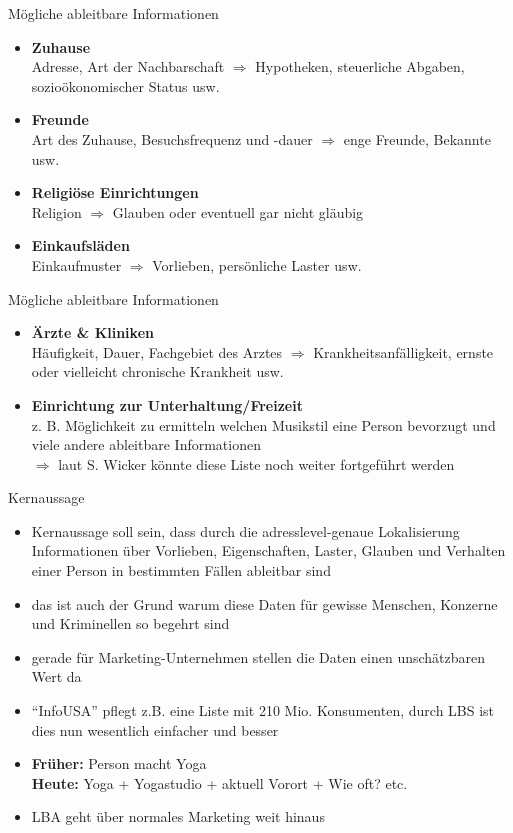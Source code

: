 \begin{frame}{Mögliche ableitbare Informationen}
  \begin{itemize}
  \item \textbf{Zuhause}\\
  Adresse, Art der Nachbarschaft $\Rightarrow$ Hypotheken, steuerliche Abgaben, sozioökonomischer Status usw.
  \item \textbf{Freunde}\\
  Art des Zuhause, Besuchsfrequenz und -dauer $\Rightarrow$ enge Freunde, Bekannte usw.
  \item \textbf{Religiöse Einrichtungen}\\
  Religion $\Rightarrow$ Glauben oder eventuell gar nicht gläubig
  \item \textbf{Einkaufsläden}\\
  Einkaufmuster $\Rightarrow$ Vorlieben, persönliche Laster usw.
  \end{itemize}
\end{frame}

\begin{frame}{Mögliche ableitbare Informationen}
  \begin{itemize}
  \item \textbf{Ärzte \& Kliniken}\\
  Häufigkeit, Dauer, Fachgebiet des Arztes $\Rightarrow$ Krankheitsanfälligkeit, ernste oder
  vielleicht chronische Krankheit usw.
  \item \textbf{Einrichtung zur Unterhaltung/Freizeit}\\
  z. B. Möglichkeit zu ermitteln welchen Musikstil eine Person bevorzugt und viele andere ableitbare Informationen \\ \vspace{.2cm}
  \hspace{-.5cm} $\Rightarrow$ laut S. Wicker könnte diese Liste noch weiter fortgeführt werden
  \end{itemize}
\end{frame}

\begin{frame}{Kernaussage}
  \begin{itemize}
  \item Kernaussage soll sein, dass durch die adresslevel-genaue Lokalisierung Informationen über Vorlieben,
  Eigenschaften, Laster, Glauben und Verhalten einer Person in bestimmten Fällen ableitbar sind
  \item das ist auch der Grund warum diese Daten für gewisse Menschen, Konzerne und Kriminellen so begehrt sind
  \item gerade für Marketing-Unternehmen stellen die Daten einen unschätzbaren Wert da
  \item "`InfoUSA"' pflegt z.B. eine Liste mit 210 Mio. Konsumenten, durch LBS ist dies nun wesentlich einfacher und besser 
  \item \textbf{Früher:} Person macht Yoga\\
  \textbf{Heute:} Yoga + Yogastudio + aktuell Vorort + Wie oft? etc.
  \item LBA geht über normales Marketing weit hinaus
  \end{itemize}
\end{frame}

